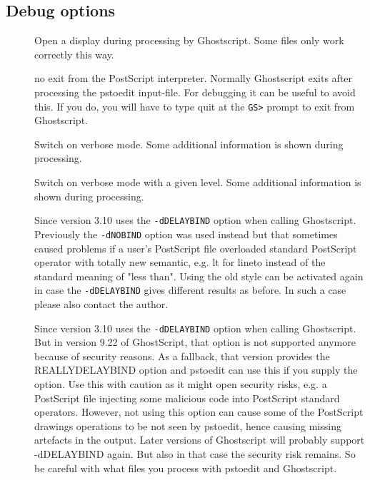 \documentclass[english,a4paper]{article}
\begin{document}
\subsection{Debug options}
\begin{description}
\item[]
Open a display during processing by Ghostscript. Some files only work correctly this way.


\item[]



\item[]
no exit from the PostScript interpreter. Normally Ghostscript exits after processing the pstoedit input-file. For debugging it can be useful to avoid this. If you do, you will have to type quit at the \verb+GS>+ prompt to exit from Ghostscript.


\item[]
Switch on verbose mode. Some additional information is shown during processing.


\item[]
Switch on verbose mode with a given level. Some additional information is shown during processing.


\item[]
Since version 3.10  uses the \texttt{-dDELAYBIND} option when calling Ghostscript. Previously the \texttt{-dNOBIND} option was used instead but that sometimes caused problems if a user's PostScript file overloaded standard PostScript operator with totally new semantic, e.g. lt for lineto instead of the standard meaning of "less than". Using  the old style can be activated again in case the \texttt{-dDELAYBIND} gives different results as before. In such a case please also contact the author.


\item[]
Since version 3.10  uses the \texttt{-dDELAYBIND} option when calling Ghostscript. But in version 9.22 of GhostScript, that option is not supported anymore because of security reasons. As a fallback, that version provides the REALLYDELAYBIND option and pstoedit can use this if you supply the  option. Use this with caution as it might open security risks, e.g. a PostScript file injecting some malicious code into PostScript standard operators. However, not using this option can cause some of the PostScript drawings operations to be not seen by pstoedit, hence causing missing artefacts in the output. Later versions of Ghostscript will probably support -dDELAYBIND again. But also in that case the security risk remains. So be careful with what files you process with pstoedit and Ghostscript.



\end{description}
\end{document}
